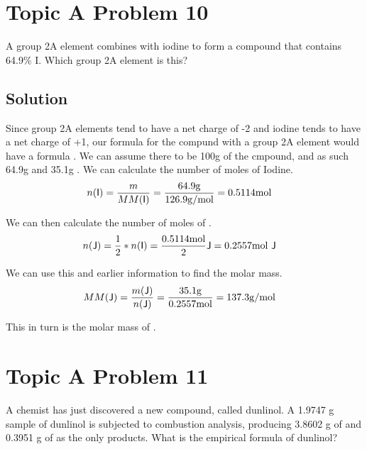 \documentclass[10pt]{article}
\begin{document}
    \pagebreak
    \section{Topic A Problem 10}
        A group 2A element combines with iodine to form a compound that contains 64.9\% I. 
        Which group 2A element is this? 

        \subsection{Solution}
            Since group 2A elements tend to have a net charge of -2 and iodine tends to have a net charge of +1, our formula for the compund with a group 2A element  would have a formula .
            We can assume there to be 100\unit{\gram} of the cmpound, and as such 64.9\unit{\gram}  and 35.1\unit{\gram} .
            We can calculate the number of moles of Iodine.
            \begin{align}
                n(\ce{I})   &=  \frac{m}{MM(\ce{I})}
                    =   \frac{64.9\unit{\gram}}{126.9 \unit{\gram/\mole}}
                    =   0.5114 \unit{\mole}
            \end{align}

            We can then calculate the number of moles of .
            \begin{align}
                n(\ce{J})   &=  \frac{1}{2} * n(\ce{I})
                    =   \frac{0.5114\unit{\mole}}{2} \ce{J}
                    =   0.2557 \unit{\mole}\ \ce{J}
            \end{align}

            We can use this and earlier information to find the molar mass.
            \begin{align}
                MM(\ce{J})  &=  \frac{m(\ce{J})}{n(\ce{J})}
                    =   \frac{35.1 \unit{\gram}}{0.2557 \unit{\mole}}
                    =   137.3 \unit{\gram/\mole}
            \end{align}

            This in turn is the molar mass of .

    \pagebreak
    \section{Topic A Problem 11}
        A chemist has just discovered a new compound, called dunlinol. 
        A 1.9747 g sample of dunlinol is subjected to combustion analysis, producing 3.8602 g of  and 0.3951 g of  as the only products. 
        What is the empirical formula of dunlinol?
\end{document}

